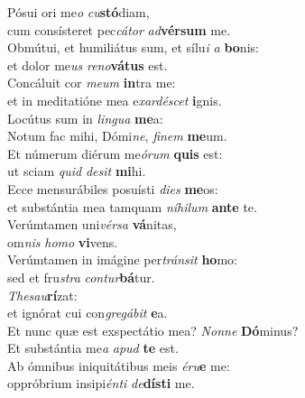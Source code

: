 \evenverse Pósui ori me\textit{o} \textit{cu}\textbf{stó}diam,~\*\\
\evenverse cum consísteret pec\textit{cá}\textit{tor} \textit{ad}\textbf{vér}\textbf{sum} me.\\
\oddverse Obmútui, et humiliátus sum, et sílu\textit{i} \textit{a} \textbf{bo}nis:~\*\\
\oddverse et dolor me\textit{us} \textit{re}\textit{no}\textbf{vá}\textbf{tus} est.\\
\evenverse Concáluit cor \textit{me}\textit{um} \textbf{in}tra me:~\*\\
\evenverse et in meditatióne mea e\textit{xar}\textit{dé}\textit{scet} \textbf{i}gnis.\\
\oddverse Locútus sum in \textit{lin}\textit{gua} \textbf{me}a:~\*\\
\oddverse Notum fac mihi, Dómi\textit{ne}, \textit{fi}\textit{nem} \textbf{me}um.\\
\evenverse Et númerum diérum me\textit{ó}\textit{rum} \textbf{quis} est:~\*\\
\evenverse ut sciam \textit{quid} \textit{de}\textit{sit} \textbf{mi}hi.\\
\oddverse Ecce mensurábiles posuísti \textit{di}\textit{es} \textbf{me}os:~\*\\
\oddverse et substántia mea tamquam \textit{ní}\textit{hi}\textit{lum} \textbf{an}\textbf{te} te.\\
\evenverse Verúmtamen uni\textit{vér}\textit{sa} \textbf{vá}nitas,~\*\\
\evenverse om\textit{nis} \textit{ho}\textit{mo} \textbf{vi}vens.\\
\oddverse Verúmtamen in imágine per\textit{trán}\textit{sit} \textbf{ho}mo:~\*\\
\oddverse sed et fru\textit{stra} \textit{con}\textit{tur}\textbf{bá}tur.\\
\evenverse \textit{The}\textit{sau}\textbf{rí}zat:~\*\\
\evenverse et ignórat cui con\textit{gre}\textit{gá}\textit{bit} \textbf{e}a.\\
\oddverse Et nunc quæ est exspectátio mea? \textit{Non}\textit{ne} \textbf{Dó}minus?~\*\\
\oddverse Et substántia me\textit{a} \textit{a}\textit{pud} \textbf{te} est.\\
\evenverse Ab ómnibus iniquitátibus meis \textit{é}\textit{ru}\textbf{e} me:~\*\\
\evenverse oppróbrium insipi\textit{én}\textit{ti} \textit{de}\textbf{dí}\textbf{sti} me.\\

